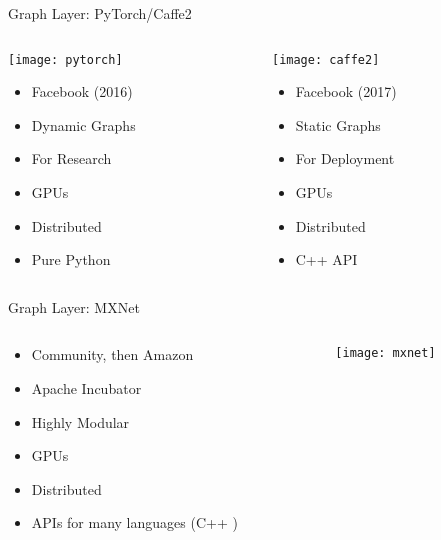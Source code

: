 \begin{slide}{Graph Layer: PyTorch/Caffe2}
  \begin{columns}
    \begin{column}{0.4\textwidth}
      \centering
      \hspace{-1.2cm}\texttt{[image: pytorch]}
      \vspace{0.2cm}

      \begin{itemize}
        \item Facebook (2016)
        \item Dynamic Graphs
        \item For Research
        \item GPUs \cmark
        \item Distributed \cmark
        \item Pure Python
      \end{itemize}
    \end{column}
    \begin{column}{0.5\textwidth}
      \centering
      \hspace{-1.2cm}\texttt{[image: caffe2]}
      \vspace{0.4cm}

      \begin{itemize}
        \item Facebook (2017)
        \item Static Graphs
        \item For Deployment
        \item GPUs \cmark
        \item Distributed \cmark
        \item C++ API \cmark
      \end{itemize}
    \end{column}
  \end{columns}
\end{slide}

\begin{slide}{Graph Layer: MXNet}
  \begin{columns}
    \begin{column}{0.5\textwidth}
      \begin{itemize}
        \item Community, then Amazon
        \item Apache Incubator
        \item Highly Modular
        \item GPUs \cmark
        \item Distributed \cmark
        \item APIs for many languages (C++ \cmark)
      \end{itemize}
    \end{column}
    \begin{column}{0.5\textwidth}
      \texttt{[image: mxnet]}
    \end{column}
  \end{columns}
\end{slide}

%
%
